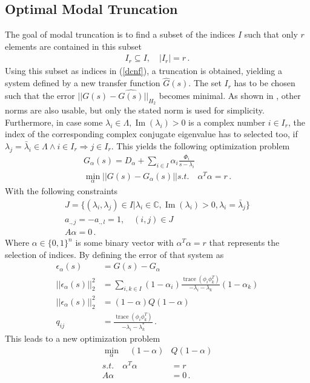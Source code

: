 \subsection{Optimal Modal Truncation}
The goal of modal truncation is to find a subset of the indices \(I\)  such that only \(r\) elements are contained in this subset
\begin{gather}
I_r \subseteq I, \quad |I_r| = r \,.
\end{gather}
Using this subset as indices in (\ref{dcnf}), a truncation is obtained, yielding a system defined by a new transfer function \(\hat{G}(s)\).
The set \(I_r\) has to be chosen such that the error \(||G(s) - \hat{G(s)}||_{H_2}\) becomes minimal.
As shown in \cite{vuillemin2020optimal}, other norms are also usable, but only the stated norm is used for simplicity.
Furthermore, in case some \(\lambda_i \in \Lambda, \operatorname{Im}(\lambda_i) > 0\) is a complex number  \(i \in I_r\), the index of the corresponding complex conjugate eigenvalue has to selected too, if \(\lambda_j = \bar{\lambda}_i \in \Lambda \wedge i \in I_r \Rightarrow j \in I_r\). 
This yields the following optimization problem
\begin{gather}
G_{\alpha}(s) = D_{\alpha} + \sum_{i \in I} \alpha_i \frac{\Phi_i}{s - \lambda_i} \\ 
\min_{\alpha} ||G(s) - G_{\alpha}(s)|| s.t. \quad
\alpha^{T}\alpha = r \,.
\end{gather}
With the following constraints
\begin{gather}
J = \{(\lambda_i, \lambda_j) \in I | \lambda_i \in \mathbb{C}, \operatorname{Im}(\lambda_i) > 0, \lambda_i = \bar{\lambda}_j\} \\
a_{.,j} = -a_{.,l} = 1, \quad	(i, j) \in J \\
A\alpha = 0 \,.
\end{gather}
Where \(\alpha \in \{0, 1\}^{n}\) is some binary vector with \(\alpha^{T} \alpha = r\) that represents the selection of indices.
By defining the error of that system as
\begin{align}
\epsilon_{\alpha}(s) &= G(s) - G_{\alpha} \\
||\epsilon_{\alpha}(s)||_2^2 &= \sum_{i, k \in I} (1-\alpha_i) \frac{\operatorname{trace}(\phi_i \phi_k^{T})}{-\lambda_i - \lambda_k}(1-\alpha_k) \\
||\epsilon_{\alpha}(s)||_2^2 &= (1-\alpha)Q(1-\alpha) \\
q_{ij} &= \frac{\operatorname{trace}(\phi_i \phi_k^{T})}{-\lambda_i - \lambda_k^*} \,.
\end{align} 
This leads to a new optimization problem \cite{vuillemin2020optimal}
\begin{align}
\min_{\alpha} \quad (1-\alpha)&Q(1-\alpha) \label{opt-h2}\\
s.t. \quad \alpha^T\alpha &= r \\
A\alpha &= 0 \,.
\end{align}

